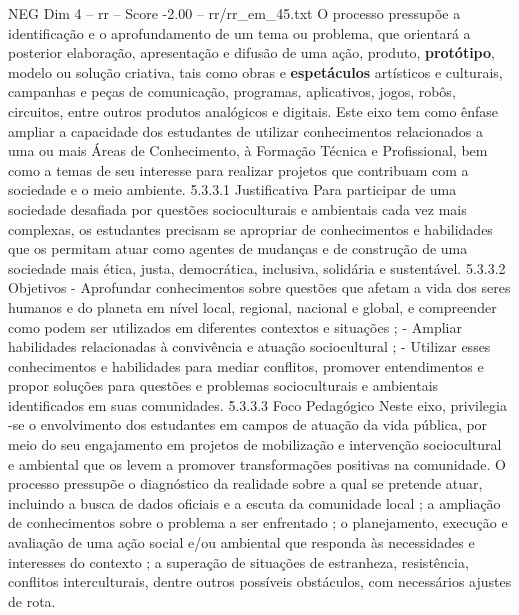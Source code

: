 \begin{textsample}{NEG Dim 4 – rr – Score -2.00 – rr/rr\_em\_45.txt}
O processo pressupõe a identificação e o aprofundamento de um tema ou problema, que orientará a posterior elaboração, apresentação e difusão de uma ação, produto, \textbf{protótipo}, modelo ou solução criativa, tais como obras e \textbf{espetáculos} artísticos e culturais, campanhas e peças de comunicação, programas, aplicativos, jogos, robôs, circuitos, entre outros produtos analógicos e digitais.
Este eixo tem como ênfase ampliar a capacidade dos estudantes de utilizar conhecimentos relacionados a uma ou mais Áreas de Conhecimento, à Formação Técnica e Profissional, bem como a temas de seu interesse para realizar projetos que contribuam com a sociedade e o meio ambiente. 5.3.3.1 Justificativa Para participar de uma sociedade desafiada por questões socioculturais e ambientais cada vez mais complexas, os estudantes precisam se apropriar de conhecimentos e habilidades que os permitam atuar como agentes de mudanças e de construção de uma sociedade mais ética, justa, democrática, inclusiva, solidária e sustentável. 5.3.3.2 Objetivos - Aprofundar conhecimentos sobre questões que afetam a vida dos seres humanos e do planeta em nível local, regional, nacional e global, e compreender como podem ser utilizados em diferentes contextos e situações ; - Ampliar habilidades relacionadas à convivência e atuação sociocultural ; - Utilizar esses conhecimentos e habilidades para mediar conflitos, promover entendimentos e propor soluções para questões e problemas socioculturais e ambientais identificados em suas comunidades. 5.3.3.3 Foco Pedagógico Neste eixo, privilegia -se o envolvimento dos estudantes em campos de atuação da vida pública, por meio do seu engajamento em projetos de mobilização e intervenção sociocultural e ambiental que os levem a promover transformações positivas na comunidade.
O processo pressupõe o diagnóstico da realidade sobre a qual se pretende atuar, incluindo a busca de dados oficiais e a escuta da comunidade local ; a ampliação de conhecimentos sobre o problema a ser enfrentado ; o planejamento, execução e avaliação de uma ação social e/ou ambiental que responda às necessidades e interesses do contexto ; a superação de situações de estranheza, resistência, conflitos interculturais, dentre outros possíveis obstáculos, com necessários ajustes de rota.

\end{textsample}
